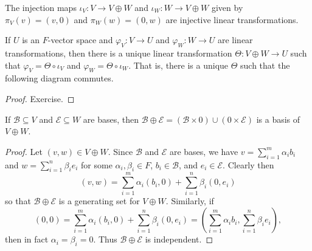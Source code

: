 \documentclass{memoir}
\begin{document}
\begin{prp} \mbox{}
\begin{enumerate*}
\item The injection maps $\iota_V : V \rightarrow V \oplus W$ and $\iota_W : W \rightarrow V \oplus W$ given by $\pi_V(v) = (v,0)$ and $\pi_W(w) = (0,w)$ are injective linear transformations.
\item If $U$ is an $F$-vector space and $\varphi_V : V \rightarrow U$ and $\varphi_W : W \rightarrow U$ are linear transformations, then there is a unique linear transformation $\Theta : V \oplus W \rightarrow U$ such that $\varphi_V = \Theta \circ \iota_V$ and $\varphi_W = \Theta \circ \iota_W$. That is, there is a unique $\Theta$ such that the following diagram commutes.

\begin{center}
\end{center}
\end{enumerate*}
\end{prp}

\begin{proof}
Exercise.
\end{proof}

\begin{prp}
If $\mathcal{B} \subseteq V$ and $\mathcal{E} \subseteq W$ are bases, then $\mathcal{B} \oplus \mathcal{E} = (\mathcal{B} \times 0) \cup (0 \times \mathcal{E})$ is a basis of $V \oplus W$.
\end{prp}

\begin{proof}
Let $(v,w) \in V \oplus W$. Since $\mathcal{B}$ and $\mathcal{E}$ are bases, we have $v = \sum_{i=1}^m \alpha_i b_i$ and $w = \sum_{i=1}^n \beta_i e_i$ for some $\alpha_i,\beta_i \in F$, $b_i \in \mathcal{B}$, and $e_i \in \mathcal{E}$. Clearly then \[ (v,w) = \sum_{i=1}^m \alpha_i (b_i,0) + \sum_{i=1}^n \beta_i(0,e_i) \] so that $\mathcal{B} \oplus \mathcal{E}$ is a generating set for $V \oplus W$. Similarly, if \[ (0,0) = \sum_{i=1}^m \alpha_i (b_i,0) + \sum_{i=1}^n \beta_i(0,e_i) = \left(\sum_{i=1}^m \alpha_i b_i, \sum_{i=1}^n \beta_i e_i\right), \] then in fact $\alpha_i = \beta_i = 0$. Thus $\mathcal{B} \oplus \mathcal{E}$ is independent.
\end{proof}
\end{document}
